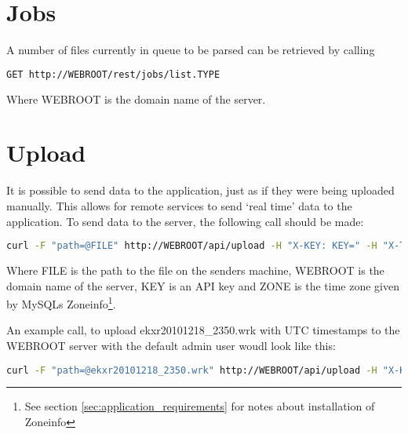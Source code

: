 \section{Jobs}
A number of files currently in queue to be parsed can be retrieved by calling
\begin{lstlisting}[language=sh]
GET http://WEBROOT/rest/jobs/list.TYPE
\end{lstlisting}
Where \textsf{WEBROOT} is the domain name of the server.

\section{Upload}
It is possible to send data to the application, just as if they were being uploaded manually. This allows for remote services to send `real time' data to the application. To send data to the server, the following call should be made:
\begin{lstlisting}[language=sh]
curl -F "path=@FILE" http://WEBROOT/api/upload -H "X-KEY: KEY=" -H "X-TIMEZONE: ZONE" -X POST
\end{lstlisting}
Where \textsf{FILE} is the path to the file on the senders machine, \textsf{WEBROOT} is the domain name of the server, \textsf{KEY} is an API key and \textsf{ZONE} is the time zone given by MySQLs Zoneinfo\footnote{See section \ref{sec:application_requirements} for notes about installation of Zoneinfo}.

An example call, to upload \textsf{ekxr20101218\_2350.wrk} with UTC timestamps to the \textsf{WEBROOT} server with the default admin user woudl look like this:
\begin{lstlisting}[language=sh]
curl -F "path=@ekxr20101218_2350.wrk" http://WEBROOT/api/upload -H "X-KEY: YWqmPGH+dOEvOh6pf83a62lzJ1QQLHRMPHhNIaohB3s=" -H "X-TIMEZONE: UTC" -X POST
\end{lstlisting}